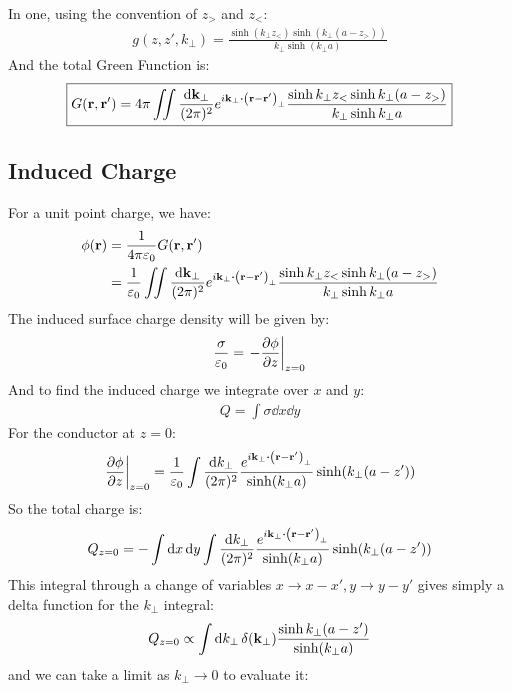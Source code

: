 \documentclass[12pt]{article}
\begin{document}
In one, using the convention of $z_>$ and $z_<$:
\begin{align*}
  g(z,z',k_\perp)=\frac{\sinh(k_\perp z_<)\sinh(k_\perp(a-z_>))}
  {k_\perp\sinh(k_\perp a)}
\end{align*}
And the total Green Function is:
\begin{align}
  \boxed{
    G(\vb{r,r}')=4\pi\iint\frac{\dd{\vb{k}_\perp}}{(2\pi)^2}
    e^{i\vb{k}_\perp\vdot\qty(\vb{r-r}')_\perp}
    \frac{\sinh k_\perp z_<\sinh k_\perp(a-z_>)}{k_\perp\sinh k_\perp a}
  }
\end{align}
\subsection{Induced Charge}
For a unit point charge, we have:
\begin{align*}
  \phi(\vb{r})&=\frac1{4\pi\varepsilon_0}G(\vb{r,r}')\\
  &=\frac1{\varepsilon_0}\iint\frac{\dd{\vb{k}_\perp}}{(2\pi)^2}
    e^{i\vb{k}_\perp\vdot\qty(\vb{r-r}')_\perp}
    \frac{\sinh k_\perp z_<\sinh k_\perp(a-z_>)}{k_\perp\sinh k_\perp a}
\end{align*}
The induced surface charge density will be given by:
\begin{align*}
  \frac{\sigma}{\varepsilon_0}=\eval{-\pdv{\phi}{z}}_{z=0}
\end{align*}
And to find the induced charge we integrate over $x$ and $y$:
\begin{align*}
  Q=\int\sigma\dd{x}\dd{y}
\end{align*}
For the conductor at $z=0$:
\begin{align*}
  \eval{\pdv{\phi}{z}}_{z=0}=\frac1{\varepsilon_0}\int
  \frac{\dd{k_\perp}}{(2\pi)^2}\frac{e^{i\vb{k}_\perp\vdot\qty(\vb{r-r}')_\perp}}
  {\sinh(k_\perp a)}\sinh(k_\perp(a-z'))
\end{align*}
So the total charge is:
\begin{align*}
  Q_{z=0}=-\int\dd{x}\dd{y}\int\frac{\dd{k_\perp}}{(2\pi)^2}
  \frac{e^{i\vb{k}_\perp\vdot\qty(\vb{r-r}')_\perp}}{\sinh(k_\perp a)}
  \sinh(k_\perp(a-z'))
\end{align*}
This integral through a change of variables $x\to x-x',y\to y-y'$ gives simply a delta function for the $k_\perp$ integral:
\begin{align*}
  Q_{z=0}\propto\int\dd{k_\perp}\delta(\vb{k_\perp})\frac{\sinh k_\perp(a-z')}{\sinh(k_\perp a)}
\end{align*}
and we can take a limit as $k_\perp\to0$ to evaluate it:
\end{document}
